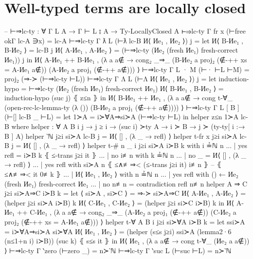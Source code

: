 \documentclass[logo,bsc,singlespacing,parskip,online]{infthesis}
\renewenvironment{code}{\mintedcopy[breaklines,breaksymbolleft=\;]{agda}}{\endmintedcopy}
\begin{document}
\section{Well-typed terms are locally closed}
\label{appendix:f_well_typed_lc}
\begin{code}
  -- ⊢⇒lc-ty : ∀ {Γ L A} → Γ ⊢ L ⦂ A → Ty-LocallyClosed A
  ⊢⇒lc-ty {Γ} {fr x} (⊢free okΓ lc-A ∋x) = lc-A
  ⊢⇒lc-ty {Γ} {ƛ L} (⊢ƛ lc-B И⟨ Иe₁ , Иe₂ ⟩) j =
    let И⟨ B-Иe₁ , B-Иe₂ ⟩ = lc-B j
        И⟨ A-Иe₁ , A-Иe₂ ⟩ =
          (⊢⇒lc-ty (Иe₂ (fresh Иe₁) {fresh-correct Иe₁})) j
    in И⟨ A-Иe₁ ++ B-Иe₁ , (λ a {a∉} → cong₂ _⇒_
      (B-Иe₂ a {proj₂ (∉-++ {xs = A-Иe₁} a∉)})
      (A-Иe₂ a {proj₁ (∉-++ a∉)})) ⟩
  ⊢⇒lc-ty {Γ} {L · M} (⊢· ⊢L ⊢M) = proj₂ (⇒-≻ (⊢⇒lc-ty ⊢L))
  ⊢⇒lc-ty {Γ} {Λ L} (⊢Λ И⟨ Иe₁ , Иe₂ ⟩) j =
    let induction-hypo = ⊢⇒lc-ty (Иe₂ (fresh Иe₁) {fresh-correct Иe₁})
        И⟨ B-Иe₁ , B-Иe₂ ⟩ = induction-hypo (suc j) ⦃ z≤n ⦄
    in И⟨ B-Иe₁ ++ Иe₁ , (λ a {a∉} → cong t-∀_
      (open-rec-lc-lemma-ty
        (λ ())
        (B-Иe₂ a {proj₁ (∉-++ a∉)}))) ⟩
  ⊢⇒lc-ty {Γ} {L [ B ]} (⊢[] lc-B _ ⊢L) =
    let 1≻A = i≻∀A⇒si≻A (⊢⇒lc-ty ⊢L)
    in helper z≤n 1≻A lc-B
    where
      helper : ∀ {A B i j}
        → j ≥ i
        → (suc i) ≻ty A
        → i ≻ B → j ≻ (ty-ty[ i :→ B ] A)
      helper {‵ℕ} j≥i si≻A lc-B j = И⟨ [] , (λ _ → refl) ⟩
      helper {t-fr x} j≥i si≻A lc-B j = И⟨ [] , (λ _ → refl) ⟩
      helper {t-# n} {_} {i} j≥i si≻A i≻B k with i ≟ℕ n
      ... | yes refl = i≻B k ⦃ ≤-trans j≥i it ⦄
      ... | no  i≢n  with k ≟ℕ n
      ...   | no  _    = И⟨ [] , (λ _ → refl) ⟩
      ...   | yes refl with si≻A n ⦃ ≤∧≢⇒< (≤-trans j≥i it) i≢n ⦄ -- ⦃ ≤∧≢⇒< it 0≢k ⦄
      ...     | И⟨ Иe₁ , Иe₂ ⟩ with n ≟ℕ n
      ...       | yes refl with () ← Иe₂ (fresh Иe₁) {fresh-correct Иe₁}
      ...       | no  n≢n =  contradiction refl n≢n
      helper {A ⇒ C} j≥i si≻A⇒C i≻B k =
        let ⟨ si≻A , si≻C ⟩ = ⇒-≻ si≻A⇒C
            И⟨ A-Иe₁ , A-Иe₂ ⟩ = (helper j≥i si≻A i≻B) k
            И⟨ C-Иe₁ , C-Иe₂ ⟩ = (helper j≥i si≻C i≻B) k
        in И⟨ A-Иe₁ ++ C-Иe₁ , (λ a {a∉} → cong₂ _⇒_
          (A-Иe₂ a {proj₁ (∉-++ a∉)})
          (C-Иe₂ a {proj₂ (∉-++ {xs = A-Иe₁} a∉)})) ⟩
      helper {t-∀ A} {B} {i} j≥i si≻∀A i≻B k =
        let ssi≻A = i≻∀A⇒si≻A si≻∀A
            И⟨ Иe₁ , Иe₂ ⟩ = (helper (s≤s j≥i) ssi≻A (lemma2·6 (n≤1+n i) i≻B)) (suc k) ⦃ s≤s it ⦄
        in И⟨ Иe₁ , (λ a {a∉} → cong t-∀_ (Иe₂ a {a∉})) ⟩
  ⊢⇒lc-ty {Γ} {‵zero} (⊢zero _) = n≻‵ℕ
  ⊢⇒lc-ty {Γ} {‵suc L} (⊢suc ⊢L) = n≻‵ℕ


\end{code}
\end{document}
